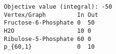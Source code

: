 \begin{verbatim}
Objective value (integral): -50
Vertex/Graph         In Out 
Fructose-6-Phosphate 0  50  
H2O                  10 0   
Ribulose-5-Phosphate 60 0   
p_{60,1}             0  10  
\end{verbatim}
